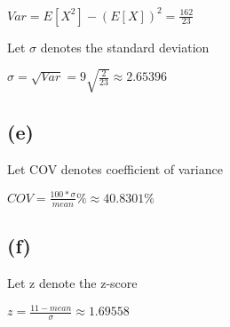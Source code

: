\documentclass[12pt]{article}
\begin{document}
\begin{spacing}{2.0}
$Var=E[X^2]-(E[X])^2= \frac{162}{23}$  

Let $\sigma$ denotes the standard deviation

$\sigma=\sqrt{Var}= 9 \sqrt{\frac{2}{23}} \approx 2.65396$

\subsection*{(e)}

Let COV denotes coefficient of variance

$COV= \frac{100*\sigma}{mean} \% \approx 40.8301 \% $

\subsection*{(f)}

Let z denote the z-score

$z=\frac{11-mean}{\sigma}\approx 1.69558 $

\end{spacing}
\end{document}
